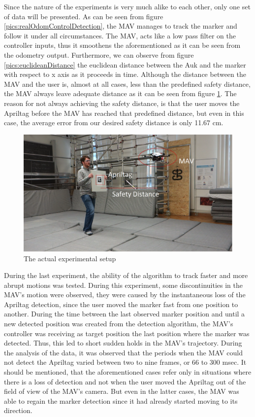 Since the nature of the experiments is very much alike to each other, only one set of data will be presented. As can be seen from figure \ref{pics:realOdomControlDetection}, the MAV manages to track the marker and follow it under all circumstances. The MAV, acts like a low pass filter on the controller inputs, thus it smoothens the aforementioned as it can be seen from the odometry output. Furthermore, we can observe from figure \ref{pics:euclideanDistance} the euclidean distance between the Auk and the marker with respect to x axis as it proceeds in time. Although the distance between the MAV and the user is, almost at all cases, less than the predefined safety distance, the MAV always leave adequate distance as it can be seen from figure \ref{pics:experimentCapture}. The reason for not always achieving the safety distance, is that the user moves the Apriltag before the MAV has reached that predefined distance, but even in this case, the average error from our desired safety distance is only 11.67 cm.   

\begin{figure}
	\centering
	 \includegraphics[width=1.00\textwidth]{images/real_experiment_v1.pdf}
	 \caption{The actual experimental setup}
	 \label{pics:experimentCapture}
\end{figure}

During the last experiment, the ability of the algorithm to track faster and more abrupt motions was tested. During this experiment, some discontinuities in the MAV's motion were observed, they were caused by the instantaneous loss of the Apriltag detection, since the user moved the marker fast from one position to another. During the time between the last observed marker position and until a new detected position was created from the detection algorithm, the MAV's controller was receiving as target position the last position where the marker was detected. Thus, this led to short sudden holds in the MAV's trajectory. During the analysis of the data, it was observed that the periods when the MAV could not detect the Apriltag varied between two to nine frames, or 66 to 300 msec. It should be mentioned, that the aforementioned cases refer only in situations where there is a loss of detection and not when the user moved the Apriltag out of the field of view of the MAV's camera. But even in the latter cases, the MAV was able to regain the marker detection since it had already started moving to its direction.   

